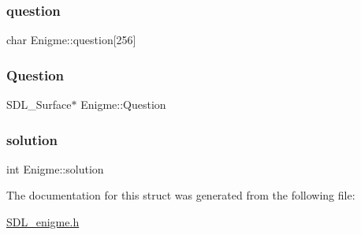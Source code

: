 \mbox{\label{structEnigme_a49a3f56c837d97e041cf100e35d230e2}} 
\subsubsection{\texorpdfstring{question}{question}}
{\footnotesize\ttfamily char Enigme\+::question\mbox{[}256\mbox{]}}

\mbox{\label{structEnigme_a82caf85f7598abd1b4c49f61fc8444d6}} 
\subsubsection{\texorpdfstring{Question}{Question}}
{\footnotesize\ttfamily S\+D\+L\+\_\+\+Surface$\ast$ Enigme\+::\+Question}

\mbox{\label{structEnigme_a22b07264c0f3795a2d9dc99a5028e075}} 
\subsubsection{\texorpdfstring{solution}{solution}}
{\footnotesize\ttfamily int Enigme\+::solution}



The documentation for this struct was generated from the following file\+:\begin{DoxyCompactItemize}
\item 
\mbox{\hyperlink{SDL__enigme_8h}{S\+D\+L\+\_\+enigme.\+h}}\end{DoxyCompactItemize}
